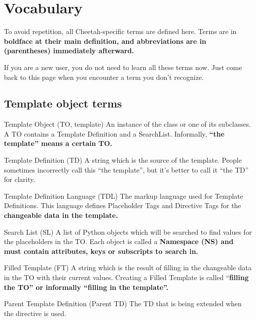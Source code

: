\section{Vocabulary}
\label{vocabulary}

To avoid repetition, all Cheetah-specific terms are defined here.  Terms are in
\bf{boldface} at their main definition, and abbreviations are in (parentheses)
immediately afterward.  

If you are a new user, you do not need to learn all these terms now.
Just come back to this page when you encounter a term you don't recognize.

\subsection{Template object terms}

\begin{description}

\item{Template Object (TO, template)}  An instance of the class
      or one of its subclasses.  A 
     TO contains a Template Definition and a SearchList.  Informally, 
     \bf{``the template''} means a certain TO.

\item{Template Definition (TD)}  A string which is the source of the template.
     People sometimes incorrectly call this ``the template'', but it's better
     to call it ``the TD'' for clarity.

\item{Template Definition Language (TDL)}  The markup language used for
     Template Definitions.  This language defines Placeholder Tags and
     Directive Tags for the \bf{changeable data} in the template.

\item{Search List (SL)}  A list of Python objects which will be searched to find
     values for the placeholders in the TO.  Each object is called a
     \bf{Namespace (NS)} and must contain attributes, keys or subscripts to
     search in.  

\item{Filled Template (FT)}  A string which is the result of filling in the
     changeable data in the TO with their current values.
     Creating a Filled Template is called ``\bf{filling} the TO'' or 
     informally ``filling in the template''.

\item{Parent Template Definition (Parent TD)}  The TD that is being extended
     when the  directive is used.

\end{description}

